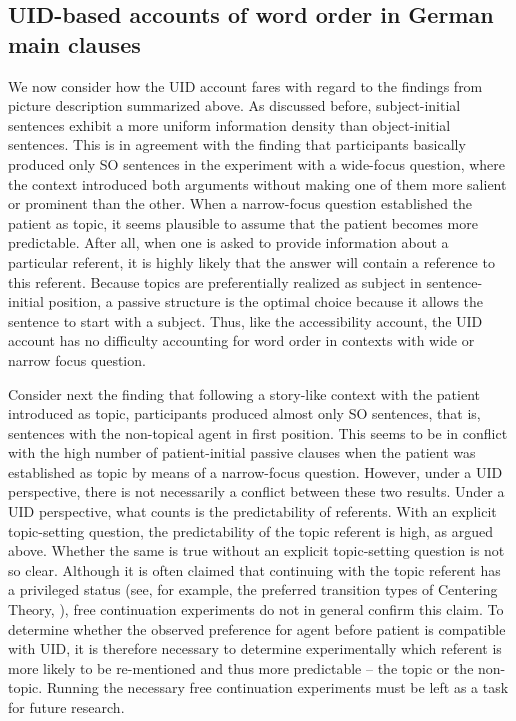 \documentclass[output=paper,colorlinks,citecolor=brown]{langscibook}
\begin{document}
\subsection{UID-based accounts of word order in German main clauses\label{section-word-order-UID}}

We now consider how the UID account fares with regard to the findings from picture description summarized above. As discussed before, subject-initial sentences exhibit a more uniform information density than object-initial sentences. This is in agreement with the finding that participants basically produced only SO sentences in the experiment with a wide-focus question, where the context introduced both arguments without making one of them more salient or prominent than the other. When a narrow-focus question established the patient as topic, it seems plausible to assume that the patient becomes more predictable. After all, when one is asked to provide information about a particular referent, it is highly likely that the answer will contain a reference to this referent. Because topics are preferentially realized as subject in sentence-initial position, a passive structure is the optimal choice because it allows the sentence to start with a subject. Thus, like the accessibility account, the UID account has no difficulty accounting for word order in contexts with wide or narrow focus question. 

Consider next the finding that following a story-like context with the patient introduced as topic, participants produced almost only SO sentences, that is, sentences with the non-topical agent in first position. This seems to be in conflict with the high number of patient-initial passive clauses when the patient was established as topic by means of a narrow-focus question. However, under a UID perspective, there is not necessarily a conflict between these two results. Under a UID perspective, what counts is the predictability of referents. With an explicit topic-setting question, the predictability of the topic referent is high, as argued above. Whether the same is true without an explicit topic-setting question is not so clear. Although it is often claimed that continuing with the topic referent has a privileged status (see, for example, the preferred transition types of Centering Theory, \citealt{Grosz::al-95}), free continuation experiments do not in general confirm this claim. To determine whether the observed preference for agent before patient is compatible with UID, it is therefore necessary to determine experimentally which referent is more likely to be re-mentioned and thus more predictable -- the topic or the non-topic. Running the necessary free continuation experiments must be left as a task for future research.
\end{document}
